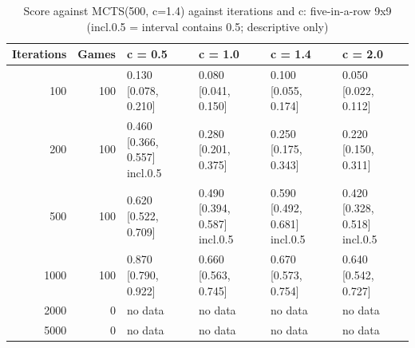 \begin{table}[!t]
\centering
\caption{Score against MCTS(500, c=1.4) against iterations and c: five-in-a-row 9x9 (incl.0.5 = interval contains 0.5; descriptive only)}
\label{tab:curve_gomoku9}
\small
\begin{tabular}{rrllll}
\toprule
Iterations & Games & c = 0.5 & c = 1.0 & c = 1.4 & c = 2.0 \\
\midrule
100 & 100 & 0.130 [0.078, 0.210] & 0.080 [0.041, 0.150] & 0.100 [0.055, 0.174] & 0.050 [0.022, 0.112] \\
200 & 100 & 0.460 [0.366, 0.557] incl.0.5 & 0.280 [0.201, 0.375] & 0.250 [0.175, 0.343] & 0.220 [0.150, 0.311] \\
500 & 100 & 0.620 [0.522, 0.709] & 0.490 [0.394, 0.587] incl.0.5 & 0.590 [0.492, 0.681] incl.0.5 & 0.420 [0.328, 0.518] incl.0.5 \\
1000 & 100 & 0.870 [0.790, 0.922] & 0.660 [0.563, 0.745] & 0.670 [0.573, 0.754] & 0.640 [0.542, 0.727] \\
2000 & 0 & no data & no data & no data & no data \\
5000 & 0 & no data & no data & no data & no data \\
\bottomrule
\end{tabular}
\end{table}
